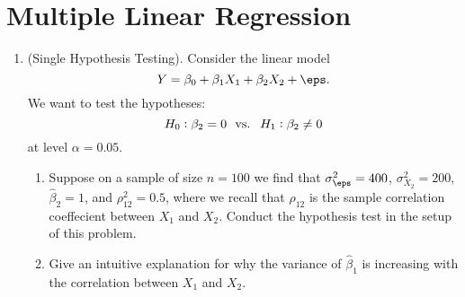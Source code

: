 \documentclass[10pt]{article}
\begin{document}
\section*{Multiple Linear Regression}%
\label{sec:multiple-linear-regression}


\begin{enumerate}
	\item (Single Hypothesis Testing). Consider the linear model
	\[
	    Y = \beta_0 + \beta_1 X_1 + \beta_2 X_2 + \eps
	.\]
	We want to test the hypotheses:
	\[
	    H_0: \beta_2 = 0 \hbox{ }\text{ vs. }\hbox{ } H_1: \beta_2 \neq 0
	\] 
	at level \(\alpha = 0.05\).
	\begin{enumerate}
		\item Suppose on a sample of size \(n = 100\) we find that  \(\sigma_\eps^2 = 400\),  \(\sigma_{X_2}^2 = 200\), \(\hat\beta_2 = 1\), and \(\rho_{12}^2 = 0.5\), where we recall that \(\rho_{12}\) is the sample correlation coeffecient between  \(X_1\) and  \(X_2\). Conduct the hypothesis test in the setup of this problem.
		\item Give an intuitive explanation for why the variance of \(\hat\beta_1\) is increasing with the correlation between \(X_1\) and  \(X_2\).
	\end{enumerate}


\end{enumerate}
\end{document}
